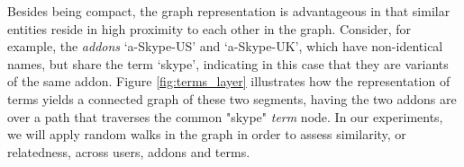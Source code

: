 \documentclass[ijoc,nonblindrev]{informs3} %
\numberwithin{equation}{subsection}
\begin{document}
Besides being compact, the graph representation is advantageous in that similar entities reside in high proximity to each other in the graph. Consider, for example, the {\it addons} `a-Skype-US' and `a-Skype-UK', which have non-identical names, but share the term `skype', indicating in this case that they are variants of the same addon. Figure \ref{fig:terms_layer} illustrates how the representation of terms yields a connected graph of these two segments, having  the two addons are over a path that traverses the common "skype" {\it term} node. In our experiments, we will apply random walks in the graph in order to assess similarity, or relatedness, across users, addons and terms.  

 

\end{document}

